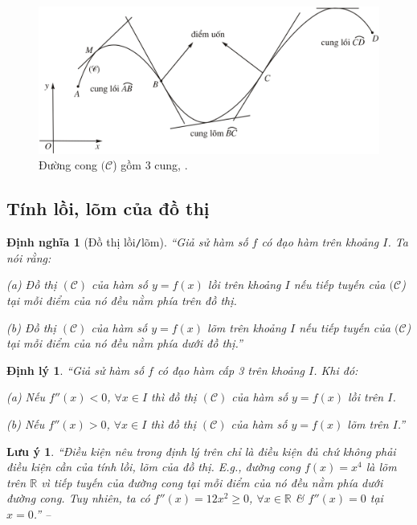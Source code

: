 \documentclass[oneside]{book}
\numberwithin{equation}{section}
\newtheorem{dinhnghia}{Định nghĩa}[section]
\newtheorem{luuy}{Lưu ý}[section]
\newtheorem{dinhly}{Định lý}[section]
\begin{document}
\begin{figure}[H]
	\centering
	\includegraphics[scale=0.2]{duong_cong_3_cung}
	\caption{Đường cong $(\mathcal{C}$) gồm 3 cung, \cite[Hình 1.22, p. 59]{SGK_Toan_12_giai_tich_nang_cao}.}
	\label{fig:duong_cong_3_cung}
\end{figure}

\subsection{Tính lồi, lõm của đồ thị}

\begin{dinhnghia}[Đồ thị lồi\texttt{/}lõm]
	``Giả sử hàm số $f$ có đạo hàm trên khoảng $I$. Ta nói rằng:
	\begin{enumerate*}
		\item[(a)] Đồ thị $(\mathcal{C})$ của hàm số $y = f(x)$ lồi trên khoảng $I$ nếu tiếp tuyến của $(\mathcal{C}$) tại mỗi điểm của nó đều nằm phía trên đồ thị.
		\item[(b)] Đồ thị $(\mathcal{C})$ của hàm số $y = f(x)$ lõm trên khoảng $I$ nếu tiếp tuyến của $(\mathcal{C}$) tại mỗi điểm của nó đều nằm phía dưới đồ thị.''
	\end{enumerate*}
\end{dinhnghia}

\begin{dinhly}
	``Giả sử hàm số $f$ có đạo hàm cấp 3 trên khoảng $I$. Khi đó:
	\begin{enumerate*}
		\item[(a)] Nếu $f''(x) < 0$, $\forall x\in I$ thì đồ thị $(\mathcal{C})$ của hàm số $y = f(x)$ lồi trên $I$.
		\item[(b)] Nếu $f''(x) > 0$, $\forall x\in I$ thì đồ thị $(\mathcal{C})$ của hàm số $y = f(x)$ lõm trên $I$.''
	\end{enumerate*}
\end{dinhly}

\begin{luuy}
	``Điều kiện nêu trong định lý trên chỉ là điều kiện đủ chứ không phải điều kiện cần của tính lồi, lõm của đồ thị. E.g., đường cong $f(x) = x^4$ là lõm trên $\mathbb{R}$ vì tiếp tuyến của đường cong tại mỗi điểm của nó đều nằm phía dưới đường cong. Tuy nhiên, ta có $f''(x) = 12x^2\ge 0$, $\forall x\in\mathbb{R}$ \& $f''(x) = 0$ tại $x = 0$.'' -- \cite[pp. 59--60]{SGK_Toan_12_giai_tich_nang_cao}
\end{luuy}
\end{document}
